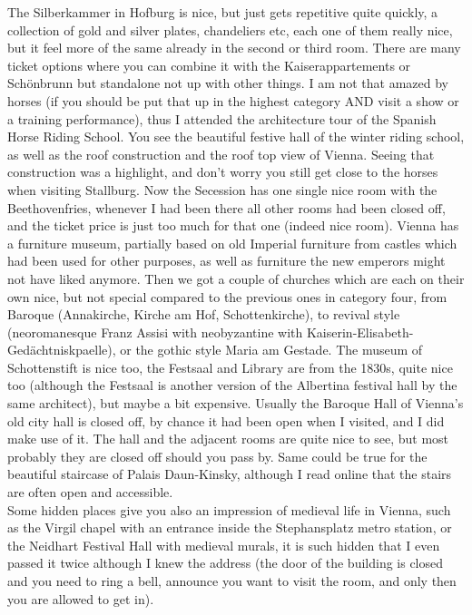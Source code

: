 The Silberkammer in Hofburg is nice, but just gets repetitive quite quickly, a collection of gold and silver plates, chandeliers etc, each one of them really nice, but it feel more of the same already in the second or third room. There are many ticket options where you can combine it with the Kaiserappartements or Sch\"onbrunn but standalone not up with other things. I am not that amazed by horses (if you should be put that up in the highest category AND visit a show or a training performance), thus I attended the architecture tour of the Spanish Horse Riding School. You see the beautiful festive hall of the winter riding school, as well as the roof construction and the roof top view of Vienna. Seeing that construction was a highlight, and don't worry you still get close to the horses when visiting Stallburg. Now the Secession has one single nice room with the Beethovenfries, whenever I had been there all other rooms had been closed off, and the ticket price is just too much for that one (indeed nice room). Vienna has a furniture museum, partially based on old Imperial furniture from castles which had been used for other purposes, as well as furniture the new emperors might not have liked anymore. Then we got a couple of churches which are each on their own nice, but not special compared to the previous ones in category four, from Baroque (Annakirche, Kirche am Hof, Schottenkirche), to revival style (neoromanesque Franz Assisi with neobyzantine with Kaiserin-Elisabeth-Ged\"achtniskpaelle), or the gothic style Maria am Gestade. The museum of Schottenstift is nice too, the Festsaal and Library are from the 1830s, quite nice too (although the Festsaal is another version of the Albertina festival hall by the same architect), but maybe a bit expensive. Usually the Baroque Hall of Vienna's old city hall is closed off, by chance it had been open when I visited, and I did make use of it. The hall and the adjacent rooms are quite nice to see, but most probably they are closed off should you pass by. Same could be true for the beautiful staircase of Palais Daun-Kinsky, although I read online that the stairs are often open and accessible.\\
Some hidden places give you also an impression of medieval life in Vienna, such as the Virgil chapel with an entrance inside the Stephansplatz metro station, or the Neidhart Festival Hall with medieval murals, it is such hidden that I even passed it twice although I knew the address (the door of the building is closed and you need to ring a bell, announce you want to visit the room, and only then you are allowed to get in).

